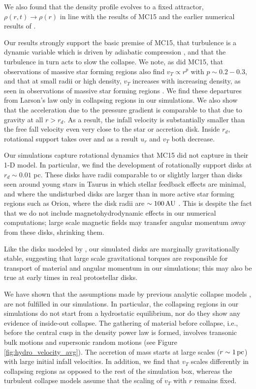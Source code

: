 \documentclass[../dissertation.tex]{subfiles}
\begin{document}
We also found that the density profile evolves
to a fixed attractor, $\rho(r,t ) \rightarrow \rho(r)$ in line with the results of MC15 and 
the earlier numerical results of \citet{2015ApJ...800...49L}. 

Our results strongly support the basic premise of MC15, that turbulence is a dynamic variable 
which is driven by adiabatic compression \citep{2012ApJ...750L..31R}, and that the turbulence
in turn acts to slow the collapse. 
We note, as did MC15, that observations of massive star forming regions also find $v_T \propto r^p$ 
with $ p \sim 0.2-0.3$, and that at small radii or high density, $v_T$  
increases with increasing density, as seen in observations of massive star forming
regions \citep{1997ApJ...476..730P}. We find these departures from Larson's law only in
collapsing regions in our simulations. We also show that the acceleration 
due to the pressure gradient is comparable to that due to gravity at all $r>r_d$. 
As a result, the infall velocity is substantially smaller than the free fall velocity
even very close to the star or accretion disk. Inside $r_d$, rotational support takes over 
and as a result $u_r$ and $v_T$ both decrease.  

Our simulations capture rotational dynamics that MC15 did not capture in their 1-D model.  
In particular, we find the development of rotationally support disks at $r_d \sim 0.01$ pc.  
These disks have radii comparable to  or slightly larger than disks seen around 
young stars in Taurus \citep{1999AJ....117.1490P} in which stellar feedback effects are minimal,
and where the undisturbed disks are larger than in more active star forming regions such as Orion, 
where the disk radii are $\sim 100\,\rm AU$ \citep{2011ARA&A..49...67W}.  
This is despite the fact that we do not include magnetohydrodynamic effects 
in our numerical computations;  large scale magnetic fields may transfer angular 
momentum away from these disks, shrinking them.  

Like the disks modeled by \citet{2010ApJ...708.1585K},
our simulated disks are 
marginally gravitationally stable, suggesting that large scale gravitational torques are 
responsible for transport of material and angular momentum in our simulations; this may
also be true at early times in real protostellar disks.  

We have shown that the assumptions made by previous analytic collapse models
\citep{1977ApJ...214..488S,1992ApJ...396..631M,1997ApJ...476..750M,2003ApJ...585..850M}, 
are not fulfilled in our simulations.  In particular, 
the collapsing regions in our simulations do not start from a hydrostatic equilibrium, nor 
do they show any evidence of inside-out collapse.  The gathering of material before collapse, i.e.,
before the central cusp in the density power law is formed, involves transonic bulk motions 
and supersonic random motions (see Figure \ref{fig:hydro_velocity_avg}). The accretion of mass starts at large 
scales ($r\sim 1\,\rm pc$) with large initial infall velocities.  In addition, we find that $v_T$ 
scales differently in collapsing regions as opposed to the rest of the simulation box, 
whereas the turbulent collapse models \citep{1997ApJ...476..750M,2003ApJ...585..850M} assume 
that the scaling of $v_T$ with $r$ remains fixed.  
\end{document}
